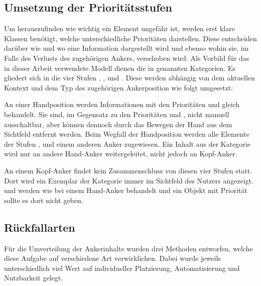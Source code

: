 		\subsection{Umsetzung der Prioritätsstufen}
			Um herauszufinden wie wichtig ein Element ungefähr ist, werden erst klare Klassen benötigt, welche unterschiedliche Prioritäten darstellen. Diese entscheiden darüber wie und wo eine Information dargestellt wird und ebenso wohin sie, im Falle des Verlusts des zugehörigen Ankers, verschoben wird.
			Als Vorbild für das in dieser Arbeit verwendete Modell dienen die in  genannten Kategorien.
			Es gliedert sich in die vier Stufen , ,  und . Diese werden abhängig von dem aktuellen Kontext und dem Typ des zugehörigen Ankerposition wie folgt umgesetzt:
			
			An einer Handposition werden Informationen mit den Prioritäten  und  gleich behandelt. Sie sind, im Gegensatz zu den Prioritäten  und , nicht manuell ausschaltbar, aber können dennoch durch das Bewegen der Hand aus dem Sichtfeld entfernt werden. Beim Wegfall der Handposition werden alle Elemente der Stufen ,  und  einem anderen Anker zugewiesen. Ein Inhalt aus der Kategorie  wird nur an andere Hand-Anker weitergeleitet, nicht jedoch an Kopf-Anker.
			
			
			An einem Kopf-Anker findet kein Zusammenschluss von diesen vier Stufen statt. Dort wird ein Exemplar der Kategorie  immer im Sichtfeld des Nutzers angezeigt.  und  werden wie bei einem Hand-Anker behandelt und ein Objekt mit Priorität  sollte es dort nicht geben.
			
			
		\subsection{Rückfallarten}\label{chapter:fallback}
			Für die Umverteilung der Ankerinhalte wurden drei Methoden entworfen, welche diese Aufgabe auf verschiedene Art verwirklichen. Dabei wurde jeweils unterschiedlich viel Wert auf individueller Platzierung, Automatisierung und Nutzbarkeit gelegt.
			
